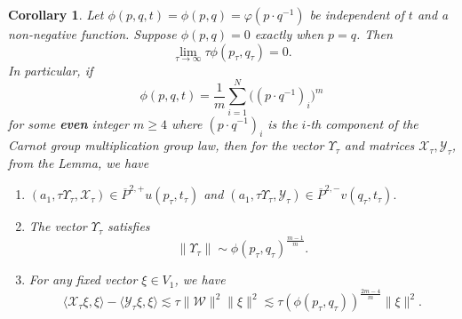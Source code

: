 \documentclass[12pt]{amsart}
\newtheorem{corollary}[thm]{Corollary}
\theoremstyle{definition}
\theoremstyle{remark}
\numberwithin{equation}{section}
\begin{document}
\begin{corollary}\label{cpmpcor}
Let $\phi(p, q, t) = \phi(p,q)=\varphi(p\cdot q^{-1})$ be independent of $t$ and a non-negative function. Suppose $\phi(p,q)=0$ exactly when $p=q$. Then
$$\lim_{\tau\to\infty} \tau \phi(p_\tau, q_\tau)=0.$$ In particular, if 
\begin{equation}\label{phidef}
\phi(p, q, t) = \frac{1}{m}\sum_{i=1}^{N}\big((p\cdot q^{-1})_i \big)^m
\end{equation}
for some \textbf{even} integer $m\geq4$ where $(p\cdot q^{-1})_i$ is the $i$-th component of the Carnot group multiplication group law, then for the vector $\Upsilon_\tau$ and matrices $\mathcal{X}_\tau, \mathcal{Y}_\tau$,  from the Lemma,  we have 
\begin{enumerate}
\item [A)] $(a_1,\tau \Upsilon_\tau,\mathcal{X}_{\tau}) \in \overline{P}^{2,+}u(p_\tau,t_\tau)$ and $(a_1,\tau \Upsilon_\tau,\mathcal{Y}_{\tau}) \in \overline{P}^{2,-}v(q_\tau,t_\tau).$
\item [B)] The vector $\Upsilon_\tau$ satisfies $$\| \Upsilon_\tau\| \sim \phi(p_\tau, q_\tau)^{\frac{m-1}{m}}.$$
\item [C)] For any fixed vector $\xi \in V_1$, we have 
 \begin{equation}
 {\ensuremath{\langle {\mathcal{X}_{\tau}\xi} , {\xi} \rangle}} - {\ensuremath{\langle {\mathcal{Y}_{\tau}\xi} , {\xi} \rangle}}\lesssim 
\tau \|\mathcal{W}\|^2\|\xi\|^2 \lesssim \tau(\phi(p_\tau, q_\tau))^{\frac{2m-4}{m}}\|\xi\|^2.\label{real2}
\end{equation}
\end{enumerate}
\end{corollary}
\end{document}
